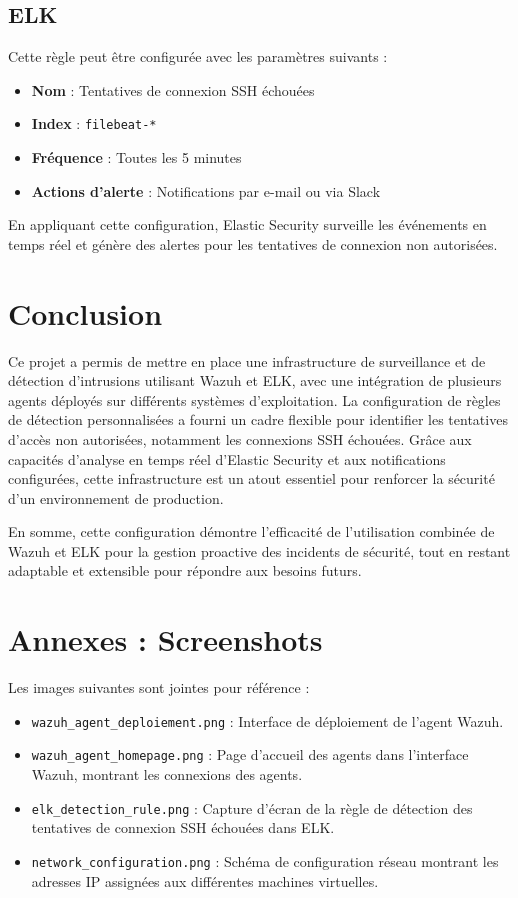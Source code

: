 \documentclass{article}
\begin{document}
\subsection{ELK}
Cette règle peut être configurée avec les paramètres suivants :
\begin{itemize}
    \item \textbf{Nom} : Tentatives de connexion SSH échouées
    \item \textbf{Index} : \texttt{filebeat-*}
    \item \textbf{Fréquence} : Toutes les 5 minutes
    \item \textbf{Actions d'alerte} : Notifications par e-mail ou via Slack
\end{itemize}

En appliquant cette configuration, Elastic Security surveille les événements en temps réel et génère des alertes pour les tentatives de connexion non autorisées.

\section*{Conclusion}
Ce projet a permis de mettre en place une infrastructure de surveillance et de détection d'intrusions utilisant Wazuh et ELK, avec une intégration de plusieurs agents déployés sur différents systèmes d'exploitation. La configuration de règles de détection personnalisées a fourni un cadre flexible pour identifier les tentatives d'accès non autorisées, notamment les connexions SSH échouées. Grâce aux capacités d'analyse en temps réel d'Elastic Security et aux notifications configurées, cette infrastructure est un atout essentiel pour renforcer la sécurité d'un environnement de production.

En somme, cette configuration démontre l'efficacité de l'utilisation combinée de Wazuh et ELK pour la gestion proactive des incidents de sécurité, tout en restant adaptable et extensible pour répondre aux besoins futurs.

\newpage
\section*{Annexes : Screenshots}
Les images suivantes sont jointes pour référence :

\begin{itemize}
    \item \texttt{wazuh\_agent\_deploiement.png} : Interface de déploiement de l'agent Wazuh.
    \item \texttt{wazuh\_agent\_homepage.png} : Page d'accueil des agents dans l'interface Wazuh, montrant les connexions des agents.
    \item \texttt{elk\_detection\_rule.png} : Capture d'écran de la règle de détection des tentatives de connexion SSH échouées dans ELK.
    \item \texttt{network\_configuration.png} : Schéma de configuration réseau montrant les adresses IP assignées aux différentes machines virtuelles.
\end{itemize}
\end{document}
